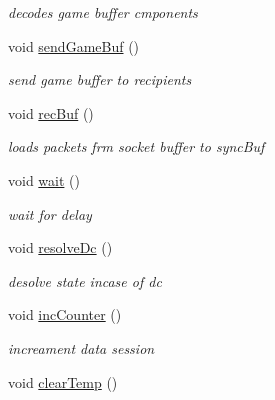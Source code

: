\begin{DoxyCompactItemize}
\begin{DoxyCompactList}\small\item\em decodes game buffer cmponents \end{DoxyCompactList}\item 
\hypertarget{class_network_ab302134b3fb19690136e5fe34eee45d9}{void \hyperlink{class_network_ab302134b3fb19690136e5fe34eee45d9}{send\+Game\+Buf} ()}\label{class_network_ab302134b3fb19690136e5fe34eee45d9}

\begin{DoxyCompactList}\small\item\em send game buffer to recipients \end{DoxyCompactList}\item 
\hypertarget{class_network_a1ab5cac1707e27103f64dd259139b126}{void \hyperlink{class_network_a1ab5cac1707e27103f64dd259139b126}{rec\+Buf} ()}\label{class_network_a1ab5cac1707e27103f64dd259139b126}

\begin{DoxyCompactList}\small\item\em loads packets frm socket buffer to sync\+Buf \end{DoxyCompactList}\item 
\hypertarget{class_network_a0671b3a74b520585e591f2d577dfaad3}{void \hyperlink{class_network_a0671b3a74b520585e591f2d577dfaad3}{wait} ()}\label{class_network_a0671b3a74b520585e591f2d577dfaad3}

\begin{DoxyCompactList}\small\item\em wait for delay \end{DoxyCompactList}\item 
\hypertarget{class_network_afa00533baa951af393f5bfadcc3348a2}{void \hyperlink{class_network_afa00533baa951af393f5bfadcc3348a2}{resolve\+Dc} ()}\label{class_network_afa00533baa951af393f5bfadcc3348a2}

\begin{DoxyCompactList}\small\item\em desolve state incase of dc \end{DoxyCompactList}\item 
\hypertarget{class_network_a49239092e2845edefa044195f9efb452}{void \hyperlink{class_network_a49239092e2845edefa044195f9efb452}{inc\+Counter} ()}\label{class_network_a49239092e2845edefa044195f9efb452}

\begin{DoxyCompactList}\small\item\em increament data session \end{DoxyCompactList}\item 
\hypertarget{class_network_a136c9ca7b831ef417fb66f20d3d4a9f4}{void \hyperlink{class_network_a136c9ca7b831ef417fb66f20d3d4a9f4}{clear\+Temp} ()}\label{class_network_a136c9ca7b831ef417fb66f20d3d4a9f4}


\end{DoxyCompactItemize}
